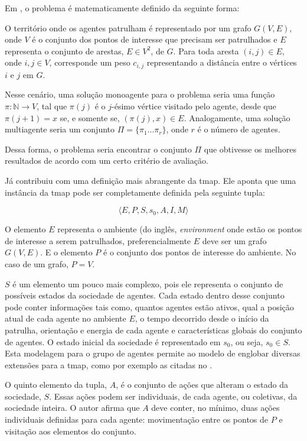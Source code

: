Em \citep{Chevaleyre:2004:TAM:1018411.1019013}, o problema é matematicamente 
definido da seguinte forma:

O território onde os agentes patrulham é representado por um grafo $G(V,E)$, 
onde $V$ é o conjunto dos pontos de interesse que precisam ser patrulhados e 
$E$ representa o conjunto de arestas, $E \in V^{2}$, de $G$. Para toda aresta 
$(i,j) \in E$, onde $i,j \in V$, corresponde um peso $c_{i,j}$ representando a 
distância entre o vértices $i$ e $j$ em $G$. 

Nesse cenário, uma solução monoagente para o problema seria uma função 
$ \pi : \mathbb{N} \longrightarrow V$, tal que $ \pi(j)$ 
é o $j$-ésimo vértice visitado pelo agente, desde que 
$ \pi(j+1) = x $ se, e somente se, $ (\pi(j), x) \in E $. Analogamente, 
uma solução multiagente seria um conjunto $ \Pi = \{ \pi_{1} ... \pi_{r} \}$, 
onde $r$ é o número de agentes.

Dessa forma, o problema seria encontrar o conjunto $ \Pi $ que obtivesse os 
melhores resultados de acordo com um certo critério de avaliação.

Já \citep{sampaiophd} contribuiu com uma definição mais abrangente da \ac{tmap}. 
Ele aponta que uma instância da \ac{tmap} pode ser completamente definida pela 
seguinte tupla: 

$$ \langle E, P, S, s_{0}, A, I, M \rangle $$

O elemento $E$ representa o ambiente (do inglês, \textit{environment} onde estão 
os pontos de interesse a serem patrulhados, preferencialmente $E$ deve ser um 
grafo $G(V,E)$. E o elemento $P$ é o conjunto dos pontos de interesse do ambiente. 
No caso de um grafo, $P = V$.

$S$ é um elemento um pouco mais complexo, pois ele 
representa o conjunto de possíveis estados da sociedade de agentes. Cada estado 
dentro desse conjunto pode conter informações tais como, quantos agentes estão 
ativos, qual a posição atual de cada agente no ambiente $E$, o tempo decorrido 
desde o início da patrulha, orientação e energia de cada agente e 
características globais do conjunto de agentes. O estado inicial da sociedade é 
representado em $s_{0}$, ou seja, $s_{0} \in S$. Esta modelagem para o grupo de 
agentes permite ao modelo de \citep{sampaiophd} englobar diversas extensões para 
a \ac{tmap}, como por exemplo as citadas no .

O quinto elemento da tupla, $A$, é o conjunto de ações que alteram o estado da 
sociedade, $S$. Essas ações podem ser individuais, de cada agente, ou coletivas, 
da sociedade inteira. O autor afirma que $A$ deve conter, no mínimo, duas ações 
individuais definidas para cada agente: movimentação entre os pontos de $P$ e 
visitação aos elementos do conjunto.

